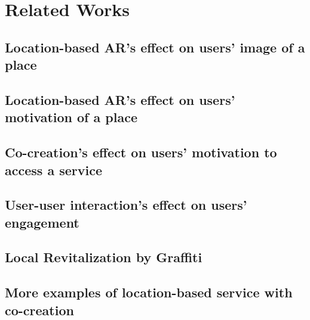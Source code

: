 \chapter{Related Works} \label{ch:3}

\section{Location-based AR's effect on users’ image of a place}

\section{Location-based AR's effect on users’ motivation of a place}

\section{Co-creation's effect on users’ motivation to access a service}

\section{User-user interaction's effect on users’ engagement}

\section{Local Revitalization by Graffiti}

\section{More examples of location-based service with co-creation}
